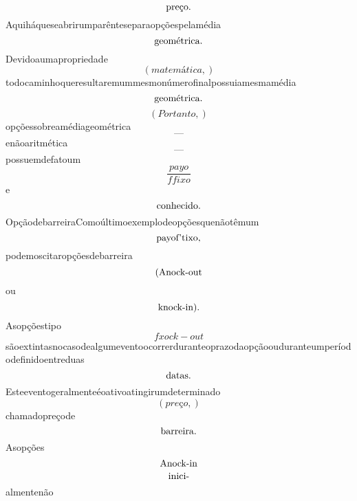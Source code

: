 \documentclass{article}
\begin{document}
\begin{equation}
$preço.$
\end{equation}Aquiháqueseabrirumparênteseparaopçõespelamédia\begin{equation}
$geométrica.$
\end{equation}Devidoaumapropriedade\begin{equation}
\left( matemática,\right)
\end{equation}todocaminhoqueresultaremummesmonúmerofinalpossuiamesmamédia\begin{equation}
$geométrica.$
\end{equation}\begin{equation}
\left( Portanto,\right)
\end{equation}opçõessobreamédiageométrica\begin{equation}
—
\end{equation}enãoaritmética\begin{equation}
—
\end{equation}possuemdefatoum\begin{equation}
\frac{payo}{ffixo}
\end{equation}e\begin{equation}
$conhecido.$
\end{equation}OpçãodebarreiraComoúltimoexemplodeopçõesquenãotêmum\begin{equation}
$payof'tixo,$
\end{equation}podemoscitaropçõesdebarreira\begin{equation}
$(Anock-out$
\end{equation}ou\begin{equation}
$knock-in).$
\end{equation}Asopçõestipo\begin{equation}
fxock - out
\end{equation}sãoextintasnocasodealgumeventoocorrerduranteoprazodaopçãoouduranteumperíododefinidoentreduas\begin{equation}
$datas.$
\end{equation}Esteeventogeralmenteéoativoatingirumdeterminado\begin{equation}
\left( preço,\right)
\end{equation}chamadopreçode\begin{equation}
$barreira.$
\end{equation}Asopções\begin{equation}
$Anock-in$
\end{equation}\begin{equation}
$inici-$
\end{equation}almentenão\begin{equation}

\end{equation}
\end{document}
